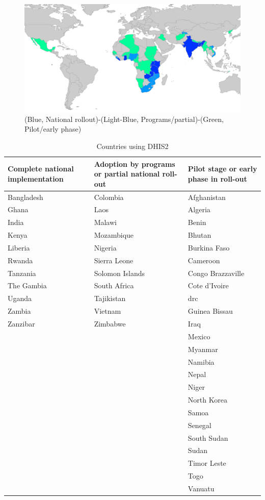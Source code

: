 \begin{figure}
\centering
\includegraphics[width=\columnwidth]{context/img/countriesUsing}
\caption{(Blue, National rollout)-(Light-Blue, Programs/partial)-(Green, Pilot/early phase)}
\label{fig:countriesusing}
\end{figure}

\begin{table}
\centering
\begin{tabular}{|p{4cm}|p{4cm}|p{4cm}|}
\hline
\textbf{Complete national implementation} & \textbf{Adoption by programs or partial national roll-out} & \textbf{Pilot stage or early phase in roll-out} \\
\hline
Bangladesh & Colombia & Afghanistan\\
Ghana & Laos & Algeria\\
India & Malawi & Benin\\
Kenya & Mozambique & Bhutan\\
Liberia & Nigeria & Burkina Faso\\
Rwanda & Sierra Leone & Cameroon\\
Tanzania & Solomon Islands & Congo Brazzaville\\
The Gambia & South Africa & Cote d'Ivoire\\
Uganda & Tajikistan & \gls{drc}\\
Zambia & Vietnam & Guinea Bissau\\
Zanzibar & Zimbabwe & Iraq\\
 & & Mexico\\
 & & Myanmar\\
 & & Namibia\\
 & & Nepal\\
 & & Niger\\
 & & North Korea\\
 & & Samoa\\
 & & Senegal\\
 & & South Sudan\\
 & & Sudan\\
 & & Timor Leste\\
 & & Togo\\
 & & Vanuatu\\
\hline
\end{tabular}
\caption{Countries using DHIS2}
\label{tab:countriesusing}
\end{table}

